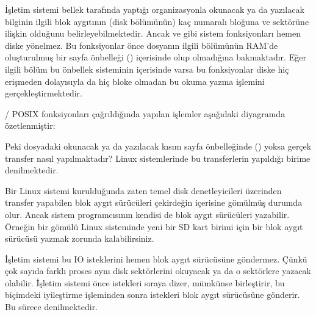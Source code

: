 \documentclass[a4paper,10pt,turkish]{sphinxmanual}
\begin{document}
\sphinxAtStartPar
İşletim sistemi bellek tarafında yaptığı organizasyonla okunacak ya da yazılacak bilginin ilgili
blok aygıtının (disk bölümünün) kaç numaralı bloğuna ve sektörüne ilişkin olduğunu
belirleyebilmektedir. Ancak  ve  gibi sistem fonksiyonları hemen diske
yönelmez. Bu fonksiyonlar önce dosyanın ilgili bölümünün RAM’de oluşturulmuş bir sayfa önbelleği
() içerisinde olup olmadığına bakmaktadır. Eğer ilgili bölüm bu önbellek sisteminin
içerisinde varsa bu fonksiyonlar diske hiç erişmeden dolayısıyla da hiç bloke olmadan bu okuma
yazma işlemini gerçekleştirmektedir.

\sphinxAtStartPar
{}/ POSIX fonksiyonları çağrıldığında yapılan işlemler aşağıdaki diyagramda
özetlenmiştir:


\sphinxAtStartPar
Peki dosyadaki okunacak ya da yazılacak kısım sayfa önbelleğinde () yoksa gerçek
transfer nasıl yapılmaktadır? Linux sistemlerinde bu transferlerin yapıldığı birime  denilmektedir.

\sphinxAtStartPar
Bir Linux sistemi kurulduğunda zaten temel disk denetleyicileri üzerinden transfer yapabilen blok
aygıt sürücüleri çekirdeğin içerisine gömülmüş durumda olur. Ancak sistem programcısının kendisi
de blok aygıt sürücüleri yazabilir. Örneğin bir gömülü Linux sisteminde yeni bir SD kart birimi
için bir blok aygıt sürücüsü yazmak zorunda kalabilirsiniz.

\sphinxAtStartPar
İşletim sistemi bu IO isteklerini hemen blok aygıt sürücüsüne göndermez. Çünkü çok sayıda
farklı proses aynı disk sektörlerini okuyacak ya da o sektörlere yazacak olabilir. İşletim
sistemi önce istekleri sıraya dizer, mümkünse birleştirir, bu biçimdeki iyileştirme işleminden
sonra istekleri blok aygıt sürücüsüne gönderir. Bu sürece 
denilmektedir.
\end{document}
